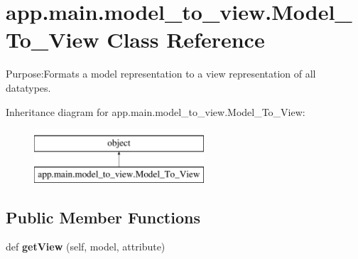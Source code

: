 \hypertarget{classapp_1_1main_1_1model__to__view_1_1Model__To__View}{}\section{app.\+main.\+model\+\_\+to\+\_\+view.\+Model\+\_\+\+To\+\_\+\+View Class Reference}
\label{classapp_1_1main_1_1model__to__view_1_1Model__To__View}


Purpose\+:Formats a model representation to a view representation of all datatypes.  


Inheritance diagram for app.\+main.\+model\+\_\+to\+\_\+view.\+Model\+\_\+\+To\+\_\+\+View\+:\begin{figure}[H]
\begin{center}
\leavevmode
\includegraphics[height=2.000000cm]{classapp_1_1main_1_1model__to__view_1_1Model__To__View}
\end{center}
\end{figure}
\subsection*{Public Member Functions}
\begin{DoxyCompactItemize}
\item 
\mbox{\label{classapp_1_1main_1_1model__to__view_1_1Model__To__View_ac63b92ae6be77e991cf490f0683cfd9f}} 
def {\bfseries get\+View} (self, model, attribute)
\end{DoxyCompactItemize}
